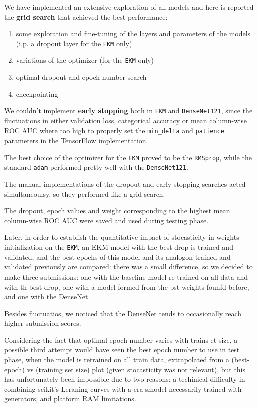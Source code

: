 \documentclass[]{article}
\providecommand{\tightlist}{%
  \setlength{\itemsep}{0pt}\setlength{\parskip}{0pt}}
\begin{document}
We have implemented an extensive exploration of all models and here is
reported the \textbf{grid search} that achieved the best performance:

\begin{enumerate}
\def\labelenumi{\arabic{enumi}.}
\tightlist
\item
  some exploration and fine-tuning of the layers and parameters of the
  models (i.p. a dropout layer for the \texttt{EKM} only)
\item
  variations of the optimizer (for the \texttt{EKM} only)
\item
  optimal dropout and epoch number search
\item
  checkpointing
\end{enumerate}

We couldn't implement \textbf{early stopping} both in \texttt{EKM} and
\texttt{DenseNet121}, since the fluctuations in either validation loss,
categorical accuracy or mean column-wise ROC AUC where too high to
properly set the \texttt{min\_delta} and \texttt{patience} parameters in
the
\href{https://www.tensorflow.org/api_docs/python/tf/keras/callbacks/EarlyStopping}{TensorFlow
implementation}.

The best choice of the optimizer for the \texttt{EKM} proved to be the
\texttt{RMSprop}, while the standard \texttt{adam} performed pretty well
with the \texttt{DenseNet121}.

The manual implementations of the dropout and early stopping searches
acted simultaneoulsy, so they performed like a grid search.

The dropout, epoch values and weight corresponding to the highest mean
column-wise ROC AUC were saved and used during testing phase.

Later, in order to establish the quantitative impact of stocasticity in
weights initialization on the \texttt{EKM}, an EKM model with the best
drop is trained and validated, and the best epochs of this model and its
analogon trained and validated previously are compared: there was a
small difference, so we decided to make three submissions: one with the
baseline model re-trained on all data and with th best drop, one with a
model formed from the bst weights founfd before, and one with the
DenseNet.

Besides fluctuatios, we noticed that the DenseNet tends to occasionally
reach higher submission scores.

Considering the fact that optimal epoch number varies with trains et
size, a possible third attempt would have seen the best epoch number to
use in test phase, when the model is retrained on all train data,
extrapolated from a (best-epoch) vs (training set size) plot (given
stocasticity was not relevant), but this has unfortunately been
impossible due to two reasons: a techinical difficulty in combining
scikit's Leraning curves with a era smodel necessarily trained with
generators, and platform RAM limitations.
\end{document}
